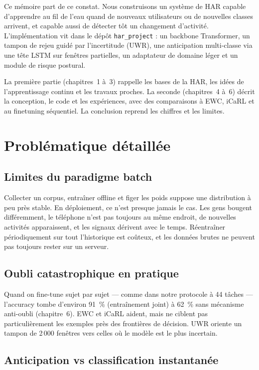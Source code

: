 \documentclass[a4paper,12pt]{report}
\begin{document}
Ce mémoire part de ce constat. Nous construisons un système de HAR capable
d'apprendre au fil de l'eau quand de nouveaux utilisateurs ou de nouvelles
classes arrivent, et capable aussi de détecter tôt un changement d'activité.
L'implémentation vit dans le dépôt \texttt{har\_project} : un backbone
Transformer, un tampon de rejeu guidé par l'incertitude (UWR), une
anticipation multi-classe via une tête LSTM sur fenêtres partielles, un
adaptateur de domaine léger et un module de risque postural.

La première partie (chapitres~1 à~3) rappelle les bases de la HAR, les idées
de l'apprentissage continu et les travaux proches. La seconde (chapitres~4
à~6) décrit la conception, le code et les expériences, avec des comparaisons
à EWC, iCaRL et au finetuning séquentiel. La conclusion reprend les chiffres
et les limites.

\section{Problématique détaillée}

\subsection{Limites du paradigme batch}

Collecter un corpus, entraîner offline et figer les poids suppose une
distribution à peu près stable. En déploiement, ce n'est presque jamais le
cas. Les gens bougent différemment, le téléphone n'est pas toujours au même
endroit, de nouvelles activités apparaissent, et les signaux dérivent avec le
temps. Réentraîner périodiquement sur tout l'historique est coûteux, et les
données brutes ne peuvent pas toujours rester sur un serveur.

\subsection{Oubli catastrophique en pratique}

Quand on fine-tune sujet par sujet --- comme dans notre protocole à 44 tâches
--- l'accuracy tombe d'environ 91~\% (entraînement joint) à 62~\% sans
mécanisme anti-oubli (chapitre~6). EWC et iCaRL aident, mais ne ciblent pas
particulièrement les exemples près des frontières de décision. UWR oriente un
tampon de 2\,000 fenêtres vers celles où le modèle est le plus incertain.

\subsection{Anticipation vs classification instantanée}
\end{document}
